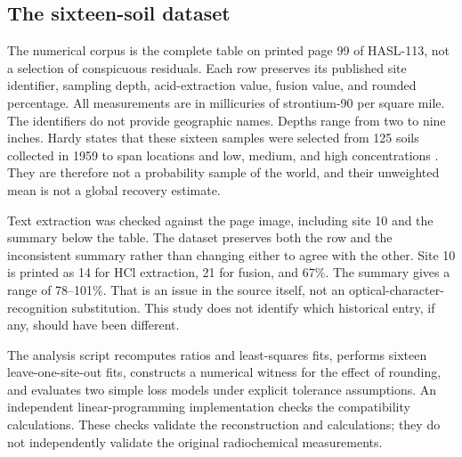 \documentclass[11pt,a4paper]{article}
\begin{document}
\subsection{The sixteen-soil dataset}
The numerical corpus is the complete table on printed page 99 of HASL-113, not a selection of conspicuous residuals. Each row preserves its published site identifier, sampling depth, acid-extraction value, fusion value, and rounded percentage. All measurements are in millicuries of strontium-90 per square mile. The identifiers do not provide geographic names. Depths range from two to nine inches. Hardy states that these sixteen samples were selected from 125 soils collected in 1959 to span locations and low, medium, and high concentrations \citep[p.~97]{hardysoil}. They are therefore not a probability sample of the world, and their unweighted mean is not a global recovery estimate.

Text extraction was checked against the page image, including site 10 and the summary below the table. The dataset preserves both the row and the inconsistent summary rather than changing either to agree with the other. Site 10 is printed as 14 for HCl extraction, 21 for fusion, and 67\%. The summary gives a range of 78--101\%. That is an issue in the source itself, not an optical-character-recognition substitution. This study does not identify which historical entry, if any, should have been different.

The analysis script recomputes ratios and least-squares fits, performs sixteen leave-one-site-out fits, constructs a numerical witness for the effect of rounding, and evaluates two simple loss models under explicit tolerance assumptions. An independent linear-programming implementation checks the compatibility calculations. These checks validate the reconstruction and calculations; they do not independently validate the original radiochemical measurements.
\end{document}
